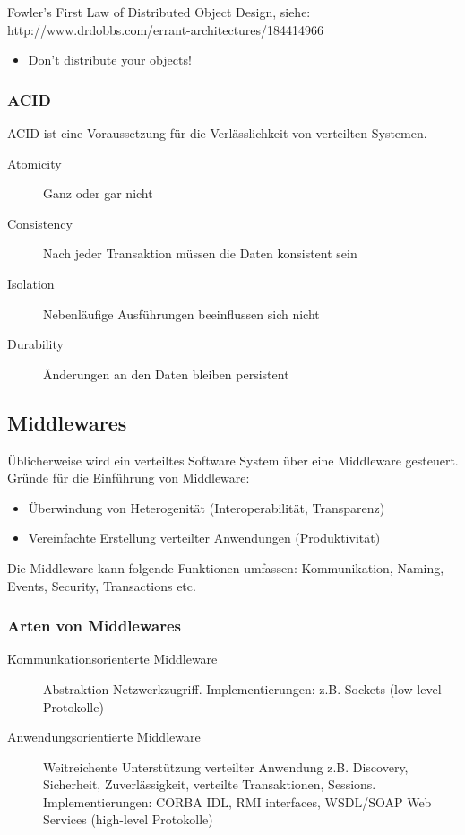 Fowler’s First Law of Distributed Object Design, siehe: http://www.drdobbs.com/errant-architectures/184414966
\begin{itemize}
	\item Don’t distribute your objects! 
\end{itemize}

\subsubsection{ACID}
ACID ist eine Voraussetzung für die Verlässlichkeit von verteilten Systemen.
\begin{description}
	\item[Atomicity] Ganz oder gar nicht
	\item[Consistency] Nach jeder Transaktion müssen die Daten konsistent sein
	\item[Isolation] Nebenläufige Ausführungen beeinflussen sich nicht
	\item[Durability] Änderungen an den Daten bleiben persistent
\end{description}

\subsection{Middlewares}

Üblicherweise wird ein verteiltes Software System über eine Middleware gesteuert. Gründe für die Einführung von Middleware:
\begin{itemize}
	\item Überwindung von Heterogenität (Interoperabilität, Transparenz)
	\item Vereinfachte Erstellung verteilter Anwendungen (Produktivität)
\end{itemize}

Die Middleware kann folgende Funktionen umfassen: Kommunikation, Naming, Events, Security, Transactions etc.

\subsubsection{Arten von Middlewares}

\begin{description}
	\item[Kommunkationsorienterte Middleware] Abstraktion Netzwerkzugriff. Implementierungen: z.B. Sockets (low-level Protokolle)
	\item[Anwendungsorientierte Middleware] Weitreichente Unterstützung verteilter Anwendung z.B. Discovery, Sicherheit, Zuverlässigkeit, verteilte Transaktionen, Sessions. Implementierungen: CORBA IDL, RMI interfaces, WSDL/SOAP Web Services (high-level Protokolle)
\end{description}

